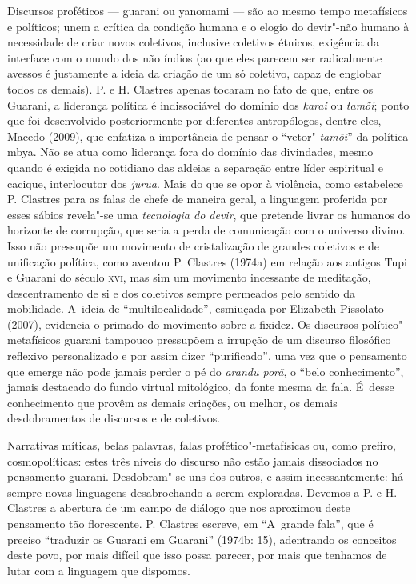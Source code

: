 Discursos proféticos --- guarani ou yanomami --- são ao mesmo tempo
metafísicos e políticos; unem a crítica da condição humana e o elogio
do devir"-não humano à necessidade de criar novos coletivos, inclusive
coletivos étnicos, exigência da interface com o mundo dos não índios
(ao que eles parecem ser radicalmente avessos é justamente a ideia da
criação de um só coletivo, capaz de englobar todos os demais). P. e H.
Clastres apenas tocaram no fato de que, entre os Guarani, a liderança
política é indissociável do domínio dos \emph{karai} ou \emph{tamõi}; ponto que foi
desenvolvido posteriormente por diferentes antropólogos, dentre eles,
Macedo (2009), que enfatiza a importância de pensar o ``vetor"-\emph{tamõi}'' da
política mbya. Não se atua como liderança fora do domínio das
divindades, mesmo quando é exigida no cotidiano das aldeias a separação
entre líder espiritual e cacique, interlocutor dos \emph{jurua}. Mais do que
se opor à violência, como estabelece P. Clastres para as falas de chefe
de maneira geral, a linguagem proferida por esses sábios revela"-se uma
\emph{tecnologia do devir}, que pretende livrar os humanos do horizonte de
corrupção, que seria a perda de comunicação com o universo divino. Isso
não pressupõe um movimento de cristalização de grandes coletivos e de
unificação política, como aventou P. Clastres (1974a) em relação aos
antigos Tupi e Guarani do século \textsc{xvi}, mas sim um movimento incessante
de meditação, descentramento de si e dos coletivos sempre permeados
pelo sentido da mobilidade. A~ideia de ``multilocalidade'', esmiuçada por
Elizabeth Pissolato (2007), evidencia o primado do movimento sobre a
fixidez. Os discursos político"-metafísicos guarani tampouco pressupõem
a irrupção de um discurso filosófico reflexivo personalizado e por
assim dizer ``purificado'', uma vez que o pensamento que emerge não pode
jamais perder o pé do \emph{arandu porã}, o ``belo conhecimento'', jamais
destacado do fundo virtual mitológico, da fonte mesma da fala. É~desse
conhecimento que provêm as demais criações, ou melhor, os demais
desdobramentos de discursos e de coletivos.

Narrativas míticas, belas palavras, falas profético"-metafísicas ou, como
prefiro, cosmopolíticas: estes três níveis do discurso não estão jamais
dissociados no pensamento guarani. Desdobram"-se uns dos outros, e assim
incessantemente: há sempre novas linguagens desabrochando a serem
exploradas. Devemos a P. e H. Clastres a abertura de um campo de
diálogo que nos aproximou deste pensamento tão florescente. P. Clastres
escreve, em ``A~grande fala'', que é preciso ``traduzir os Guarani em
Guarani'' (1974b: 15), adentrando os conceitos deste povo, por mais
difícil que isso possa parecer, por mais que tenhamos de lutar com a
linguagem que dispomos.

